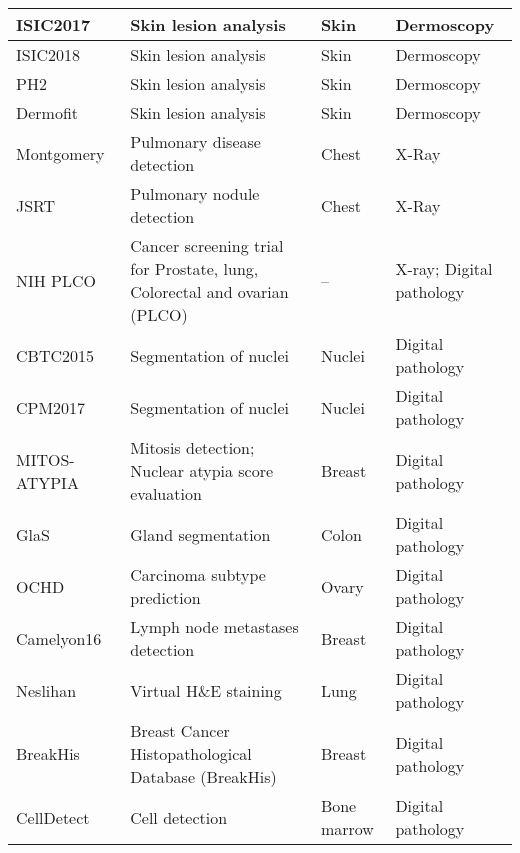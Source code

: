 \begin{longtable}{|>{\arraybackslash}p{5cm}|>{\arraybackslash}p{6cm}|>{\arraybackslash}p{1.7cm}|>{\arraybackslash}p{2.3cm}|}
	ISIC2017~\cite{codella2018skin} & Skin lesion analysis & Skin &  Dermoscopy \\ \hline 
	
	ISIC2018~\cite{ISIC2018} & Skin lesion analysis & Skin & Dermoscopy \\ \hline 
	
	PH2~\cite{mendonca2015ph2} & Skin lesion analysis & Skin & Dermoscopy \\ \hline 
	
	Dermofit~\cite{ballerini2013color} & Skin lesion analysis & Skin & Dermoscopy \\ \hline 
	
	Montgomery\cite{jaeger2014two} & Pulmonary disease detection & Chest & X-Ray \\ \hline 
	
	JSRT~\cite{shiraishi2000development} & Pulmonary nodule detection & Chest & X-Ray \\ \hline 
	
	NIH PLCO~\cite{PLCO} & Cancer screening trial for Prostate, lung, Colorectal and ovarian (PLCO)& -- & X-ray; Digital pathology \\ \hline 
	
	CBTC2015~\cite{MICCAI2015} & Segmentation of nuclei & Nuclei & Digital pathology \\ \hline 
	
	CPM2017~\cite{miccai2017} & Segmentation of nuclei & Nuclei & Digital pathology \\ \hline 
	
	MITOS-ATYPIA~\cite{mitos2014} & Mitosis detection; Nuclear atypia score evaluation & Breast & Digital pathology \\ \hline 
	
	GlaS~\cite{sirinukunwattana2017gland} & Gland segmentation & Colon & Digital pathology \\ \hline 
	
	OCHD~\cite{kobel2010diagnosis} & Carcinoma subtype prediction & Ovary & Digital pathology \\ \hline 
	
	Camelyon16~\cite{bejnordi2017diagnostic} & Lymph node metastases detection & Breast & Digital pathology \\ \hline 
	Neslihan~\cite{bayramoglu2017towards} & Virtual H\&E staining & Lung & Digital pathology \\ \hline 
	BreakHis~\cite{spanhol2016breast} & Breast Cancer Histopathological Database (BreakHis) & Breast &  Digital pathology \\ \hline
	CellDetect~\cite{kainz2015you} & Cell detection & Bone marrow & Digital pathology \\ \hline 
	

\end{longtable}
